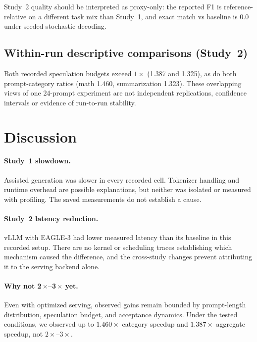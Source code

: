\documentclass[11pt]{article}
\begin{document}
Study~2 quality should be interpreted as proxy-only: the reported F1 is reference-relative on a different task mix than Study~1, and exact match vs baseline is 0.0 under seeded stochastic decoding.

\subsection{Within-run descriptive comparisons (Study~2)}
Both recorded speculation budgets exceed $1\times$ (1.387 and 1.325), as do both prompt-category ratios (math 1.460, summarization 1.323). These overlapping views of one 24-prompt experiment are not independent replications, confidence intervals or evidence of run-to-run stability.

\section{Discussion}
\paragraph{Study~1 slowdown.}
Assisted generation was slower in every recorded cell. Tokenizer handling and runtime overhead are possible explanations, but neither was isolated or measured with profiling. The saved measurements do not establish a cause.

\paragraph{Study~2 latency reduction.}
vLLM with EAGLE-3 had lower measured latency than its baseline in this recorded setup. There are no kernel or scheduling traces establishing which mechanism caused the difference, and the cross-study changes prevent attributing it to the serving backend alone.

\paragraph{Why not 2\,$\times$--3\,$\times$ yet.}
Even with optimized serving, observed gains remain bounded by prompt-length distribution, speculation budget, and acceptance dynamics. Under the tested conditions, we observed up to $1.460\times$ category speedup and $1.387\times$ aggregate speedup, not $2\times$--$3\times$.
\end{document}
